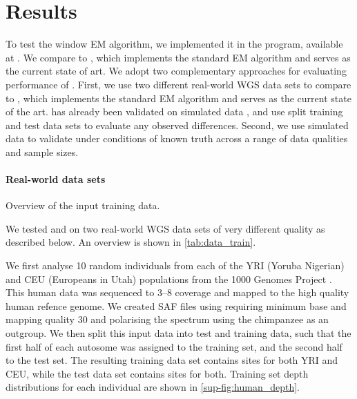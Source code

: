 \section{Results}

To test the window EM algorithm, we implemented it in the \winsfs program, available at . We compare \winsfs to \realsfs, which implements the standard EM algorithm and serves as the current state of art.
We adopt two complementary approaches for evaluating performance of \winsfs.
First, we use two different real-world WGS data sets to compare \winsfs to \realsfs, which implements the standard EM algorithm and serves as the current state of the art.
\realsfs has already been validated on simulated data \cite{Han2014, Korneliussen2014}, and use split training and test data sets to evaluate any observed differences.
Second, we use simulated data to validate \winsfs under conditions of known truth across a range of data qualities and sample sizes.

\paragraph{Real-world data sets}

\begin{table}
    \begin{center}
    \makebox[0.8\textwidth]{
        
    }
    \end{center}
    \caption{
		Overview of the input training data.
    }
    \label{tab:data_train}
\end{table}

We tested \winsfs and \realsfs on two real-world WGS data sets of very different quality as described below.
An overview is shown in \cref{tab:data_train}.

We first analyse \num{10} random individuals from each of the YRI (Yoruba Nigerian) and CEU (Europeans in Utah) populations from the 1000 Genomes Project \cite{1000g2015}.
This human data was sequenced to \SIrange{3}{8}{\depth} coverage and mapped to the high quality human refence genome.
We created SAF files using \angsd \cite{Korneliussen2014} requiring minimum base and mapping quality \num{30} and polarising the spectrum using the chimpanzee as an outgroup.
We then split this input data into test and training data, such that the first half of each autosome was assigned to the training set, and the second half to the test set.
The resulting training data set contains  sites for both YRI and CEU, while the test data set contains  sites for both.
Training set depth distributions for each individual are shown in \cref{sup-fig:human_depth}.

